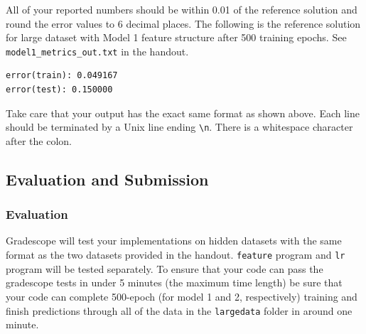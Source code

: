 \documentclass[11pt,addpoints,answers]{exam}
\begin{document}
All of your reported numbers should be within 0.01 of the reference solution and round the error values to 6 decimal places. The following is the reference solution for large dataset with Model 1 feature structure after 500 training epochs. See \newline \lstinline{model1_metrics_out.txt} in the handout.

\begin{lstlisting}
error(train): 0.049167
error(test): 0.150000
\end{lstlisting}

Take care that your output has the exact same format as shown above. Each line should be terminated by a Unix line ending \lstinline{\n}. There is a whitespace character after the colon.

\subsection{Evaluation and Submission}

\subsubsection{Evaluation}

Gradescope will test your implementations on hidden datasets with the same format as the two datasets provided in the handout. \lstinline{feature} program and \lstinline{lr} program will be tested separately. To ensure that your code can pass the gradescope tests in under 5 minutes (the maximum time length) be sure that your code can complete 500-epoch (for model 1 and 2, respectively) training and finish predictions through all of the data in the \lstinline{largedata} folder in around one minute.
\end{document}
